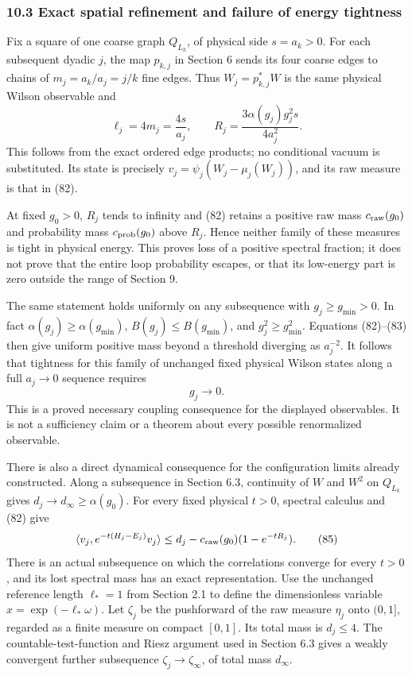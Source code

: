 \documentclass[
  11pt,
]{article}
\begin{document}
\subsubsection{10.3 Exact spatial refinement and failure of energy
tightness}\label{exact-spatial-refinement-and-failure-of-energy-tightness}

Fix a square of one coarse graph \(Q_{L_k}\), of physical side
\(s=a_k>0\). For each subsequent dyadic \(j\), the map \(p_{k,j}\) in
Section 6 sends its four coarse edges to chains of \(m_j=a_k/a_j=j/k\)
fine edges. Thus \(W_j=p_{k,j}^*W\) is the same physical Wilson
observable and \[
 \ell_j=4m_j=\frac{4s}{a_j},\qquad
 R_j=\frac{3\alpha(g_j)g_j^2s}{4a_j^2}.
 \tag{83}
\] This follows from the exact ordered edge products; no conditional
vacuum is substituted. Its state is precisely
\(v_j=\psi_j(W_j-\mu_j(W_j))\), and its raw measure is that in (82).

At fixed \(g_0>0\), \(R_j\) tends to infinity and (82) retains a
positive raw mass \(c_{\rm raw}(g_0)\) and probability mass
\(c_{\rm prob}(g_0)\) above \(R_j\). Hence neither family of these
measures is tight in physical energy. This proves loss of a positive
spectral fraction; it does not prove that the entire loop probability
escapes, or that its low-energy part is zero outside the range of
Section 9.

The same statement holds uniformly on any subsequence with
\(g_j\ge g_{\min}>0\). In fact \(\alpha(g_j)\ge\alpha(g_{\min})\),
\(B(g_j)\le B(g_{\min})\), and \(g_j^2\ge g_{\min}^2\). Equations
(82)--(83) then give uniform positive mass beyond a threshold diverging
as \(a_j^{-2}\). It follows that tightness for this family of unchanged
fixed physical Wilson states along a full \(a_j\to0\) sequence requires
\[
 g_j\longrightarrow0.
 \tag{84}
\] This is a proved necessary coupling consequence for the displayed
observables. It is not a sufficiency claim or a theorem about every
possible renormalized observable.

There is also a direct dynamical consequence for the configuration
limits already constructed. Along a subsequence in Section 6.3,
continuity of \(W\) and \(W^2\) on \(Q_{L_k}\) gives
\(d_j\to d_\infty\ge\alpha(g_0)\). For every fixed physical \(t>0\),
spectral calculus and (82) give \[
 \langle v_j,e^{-t(H_j-E_j)}v_j\rangle
 \le d_j-c_{\rm raw}(g_0)(1-e^{-tR_j}).
 \tag{85}
\] There is an actual subsequence on which the correlations converge for
every \(t>0\), and its lost spectral mass has an exact representation.
Use the unchanged reference length \(\ell_*=1\) from Section 2.1 to
define the dimensionless variable \(x=\exp(-\ell_*\omega)\). Let
\(\zeta_j\) be the pushforward of the raw measure \(\eta_j\) onto
\((0,1]\), regarded as a finite measure on compact \([0,1]\). Its total
mass is \(d_j\le4\). The countable-test-function and Riesz argument used
in Section 6.3 gives a weakly convergent further subsequence
\(\zeta_j\to\zeta_\infty\), of total mass \(d_\infty\).
\end{document}

